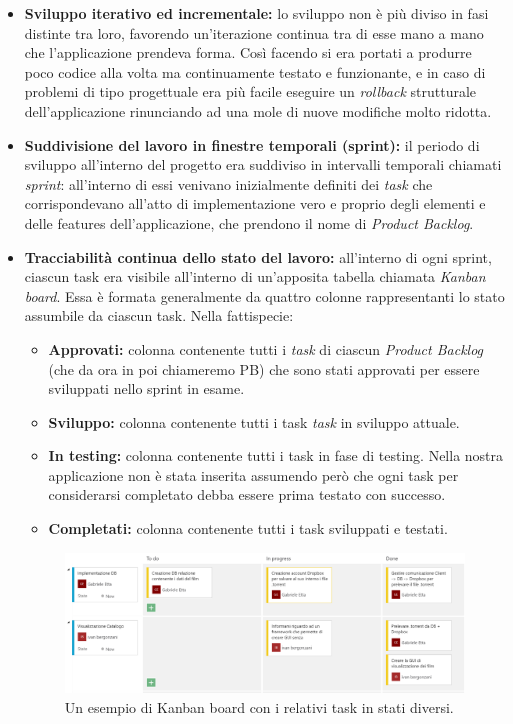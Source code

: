 \documentclass[a4]{book}
\begin{document}
\begin{itemize}
	\item \textbf{Sviluppo iterativo ed incrementale:} lo sviluppo non è più diviso in fasi distinte tra loro, favorendo un'iterazione continua tra di esse mano a mano che l'applicazione prendeva forma. Così facendo si era portati a produrre poco codice alla volta ma continuamente testato e funzionante, e in caso di problemi di tipo progettuale era più facile eseguire un \textit{rollback} strutturale dell'applicazione rinunciando ad una mole di nuove modifiche molto ridotta.
	\item \textbf{Suddivisione del lavoro in finestre temporali (sprint):} il periodo di sviluppo all'interno del progetto era suddiviso in intervalli temporali chiamati \textit{sprint}: all'interno di essi venivano inizialmente definiti dei \textit{task} che corrispondevano all'atto di implementazione vero e proprio degli elementi e delle features dell'applicazione, che prendono il nome di \textit{Product Backlog}.
	\item \textbf{Tracciabilità continua dello stato del lavoro:} all'interno di ogni sprint, ciascun task era visibile all'interno di un'apposita tabella chiamata \textit{Kanban board}. Essa è formata generalmente da quattro colonne rappresentanti lo stato assumbile da ciascun task. Nella fattispecie:
	
	\begin{itemize}
		\item \textbf{Approvati:} colonna contenente tutti i \textit{task} di ciascun \textit{Product Backlog} (che da ora in poi chiameremo PB) che sono stati approvati per essere sviluppati nello sprint in esame.
		\item \textbf{Sviluppo:} colonna contenente tutti i task \textit{task} in sviluppo attuale.
		\item \textbf{In testing:} colonna contenente tutti i task in fase di testing. Nella nostra applicazione non è stata inserita assumendo però che ogni task per considerarsi completato debba essere prima testato con successo.
		\item \textbf{Completati: } colonna contenente tutti i task sviluppati e testati.
	\end{itemize}
	
	\begin{figure}[!h]
		\begin{center}
		\caption{Un esempio di Kanban board con i relativi task in stati diversi. }
		\centering
		\includegraphics[scale=0.5]{backlog}
		\medskip
		

\end{center}
\end{figure}
\end{itemize}
\end{document}

